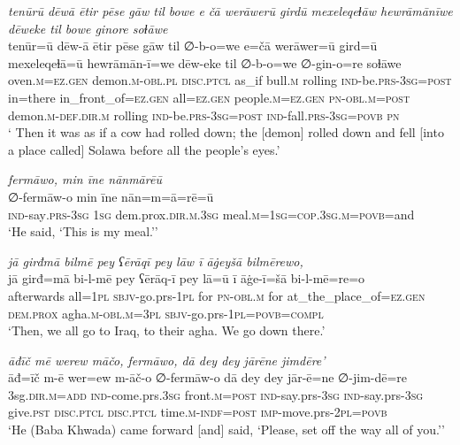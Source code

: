 \ea \label{ŽP.201}
\textit{tenūrū dēwā ētir pēse gāw til bowe e čā werāwerū girdū mexeleqeɫāw hewrāmānīwe dēweke til bowe ginore soɫāwe} \\ 
\gll tenūr=ū dēw-ā ētir pēse gāw til ∅-b-o=we e=čā werāwer=ū gird=ū mexeleqeɫā=ū hewrāmān-ī=we dēw-eke til ∅-b-o=we ∅-gin-o=re soɫāwe \\ 
 oven\textsc{.m}\textsc{\textsc{=ez.gen}} demon\textsc{.m}\textsc{-obl}\textsc{.pl} \textsc{disc.ptcl} as\_if bull\textsc{.m} rolling \textsc{ind-}be\textsc{.prs}\textsc{-3sg}\textsc{=\textsc{post}} in=there in\_front\_of\textsc{\textsc{=ez.gen}} all\textsc{\textsc{=ez.gen}} people\textsc{.m}\textsc{\textsc{=ez.gen}} \textsc{pn}\textsc{-obl}\textsc{.m}\textsc{=\textsc{post}} demon\textsc{.m}\textsc{-def}\textsc{.dir}\textsc{.m} rolling \textsc{ind-}be\textsc{.prs}\textsc{-3sg}\textsc{=\textsc{post}} \textsc{ind-}fall\textsc{.prs}\textsc{-3sg}\textsc{=\textsc{povb}} \textsc{pn} \\ 
\glt ` Then it was as if a cow had rolled down; the [demon] rolled down and fell [into a place called] Solawa before all the people’s eyes.'
\z 
 
\ea \label{ŽP.217}
\textit{fermāwo, min īne nānmārēū} \\ 
\gll ∅-fermāw-o min īne nān=m=ā=rē=ū \\ 
 \textsc{ind-}say\textsc{.prs}\textsc{-3sg} \textsc{1sg} dem.prox\textsc{.dir}\textsc{.m}\textsc{.3sg} meal\textsc{.m}\textsc{=\textsc{1sg}}\textsc{=cop}\textsc{.3sg}\textsc{.m}\textsc{=\textsc{povb}}=and \\ 
\glt `He said, ‘This is my meal.’'
\z 
 
\ea \label{BP.56}
\textit{jā girđmā bilmē pey ʕērāqī pey lāw ī āġeyšā bilmērewo,} \\ 
\gll jā girđ=mā bi-l-mē pey ʕērāq-ī pey lā=ū ī āġe-ī=šā bi-l-mē=re=o \\ 
 afterwards all\textsc{=\textsc{1pl}} \textsc{sbjv-}go.prs\textsc{-\textsc{1pl}} for \textsc{pn}\textsc{-obl}\textsc{.m} for at\_the\_place\_of\textsc{=ez.gen} \textsc{dem.prox} agha\textsc{.m}\textsc{-obl}\textsc{.m}\textsc{=3pl} \textsc{sbjv-}go.prs\textsc{-\textsc{1pl}}\textsc{=\textsc{povb}}\textsc{=compl} \\ 
\glt `Then, we all go to Iraq, to their agha. We go down there.'
\z 
 
\ea \label{BP.86}
\textit{āđīč mē werew māčo, fermāwo, dā dey dey jārēne jimdēre’} \\ 
\gll āđ=īč m-ē wer=ew m-āč-o ∅-fermāw-o dā dey dey jār-ē=ne ∅-jim-dē=re \\ 
 3sg\textsc{.dir}\textsc{.m}\textsc{=add} \textsc{ind-}come.prs\textsc{.3sg} front\textsc{.m}\textsc{=\textsc{post}} \textsc{ind-}say.prs\textsc{-3sg} \textsc{ind-}say.prs\textsc{-3sg} give\textsc{.pst} \textsc{disc.ptcl} \textsc{disc.ptcl} time\textsc{.m}\textsc{-indf}\textsc{=\textsc{post}} \textsc{imp-}move.prs-\textsc{2pl}\textsc{=\textsc{povb}} \\ 
\glt `He (Baba Khwada) came forward [and] said, ‘Please, set off the way all of you.’'
\z 
 
